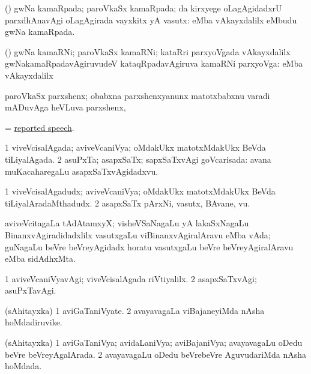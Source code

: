\bentry
{}
\gl{\nA}
\bmng
(\vAyx) gwNa kamaRpada; paroVkaSx kamaRpada; \kirx da kirxyege oLagAgidadxrU parxdhAnavAgi oLagAgirada vayxkitx yA vasutx:  eMba vAkayxdalilx  eMbudu gwNa kamaRpada. 
\emng
\eentry

\bentry
{}
\gl{\nA}
\bmng
(\vAyx) gwNa kamaRNi; paroVkaSx kamaRNi; kataRri parxyoVgada vAkayxdalilx gwNakamaRpadavAgiruvudeV kataqRpadavAgiruva kamaRNi parxyoVga:  eMba vAkayxdalilx  
\emng
\eentry

\bentry
{}
\gl{\nA}
\bmng
paroVkaSx parxshenx; obabxna parxshenxyanunx matotxbabxnu varadi mADuvAga heVLuva parxshenx, \udA\  
\emng
\eentry

\bentry
{}
\gl{\nA}
\bmng
= \hyperref{kandict_r.pdf}{R}{reported speech}{reported speech}. 
\emng
\eentry

\bentry
{}
\gl{\gu}
\bmng
\bnum
\num{1} viveVcisalAgada; aviveVcaniVya; oMdakUkx matotxMdakUkx BeVda tiLiyalAgada. 
\num{2} asuPxTa; asapxSaTx; sapxSaTxvAgi goVcarisada:  avana muKacaharegaLu asapxSaTxvAgidadxvu. 
\enum
\emng
\eentry

\bentry
{}
\gl{\nA}
\bmng
\bnum
\num{1} viveVcisalAgadudx; aviveVcaniVya; oMdakUkx matotxMdakUkx BeVda tiLiyalAradaMthadudx. 
\num{2} asapxSaTx pArxNi, vasutx, BAvane, \mo vu. 
\enum
\emng

\noindent
\gl{\pagu}
\bmng
{} aviveVcitagaLa tAdAtamxyX; visheVSaNagaLu yA lakaSxNagaLu BinanxvAgiradidadxlilx vasutxgaLu viBinanxvAgiralAravu eMba vAda; guNagaLu beVre beVreyAgidadx horatu vasutxgaLu beVre beVreyAgiralAravu eMba sidAdhxMta. 
\emng
\eentry

\bentry
{}
\gl{\kirxvi}
\bmng
\bnum
\num{1} aviveVcaniVyavAgi; viveVcisalAgada riVtiyalilx. 
\num{2} asapxSaTxvAgi; asuPxTavAgi. 
\enum
\emng
\eentry

\bentry
{}
\gl{\nA}
\bmng
(sAhitayxka) 
\bnum
\num{1} aviGaTaniVyate. 
\num{2} avayavagaLa viBajaneyiMda nAsha hoMdadiruvike. 
\enum
\emng
\eentry

\bentry
{}
\gl{\gu}
\bmng
(sAhitayxka) 
\bnum
\num{1} aviGaTaniVya; avidaLaniVya; aviBajaniVya; avayavagaLu oDedu beVre beVreyAgalArada. 
\num{2} avayavagaLu oDedu beVrebeVre AguvudariMda nAsha hoMdada. 
\enum
\emng
\eentry

